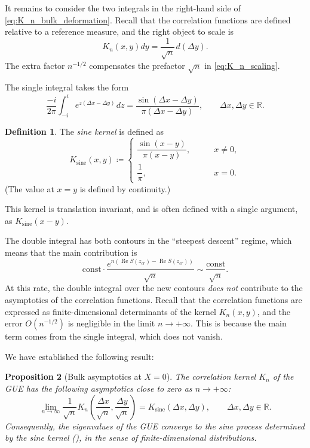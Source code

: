 \documentclass[letterpaper,11pt,oneside,reqno]{article}
\numberwithin{equation}{section}
\newcommand{\ssp}{\hspace{1pt}}
\newtheorem{proposition}{Proposition}[section]
\theoremstyle{definition}
\newtheorem{definition}[proposition]{Definition}
\begin{document}
It remains to consider the two integrals in the right-hand side
of \eqref{eq:K_n_bulk_deformation}.
Recall that the correlation functions are
defined relative to a reference measure, and the right object to scale is
\begin{equation*}
	K_n(x,y)dy=\frac{1}{\sqrt n}\ssp d\left( \Delta y \right).
\end{equation*}
The extra factor $n^{-1/2}$
compensates the prefactor $\sqrt n$ in
\eqref{eq:K_n_scaling}.

The single integral takes the form
\begin{equation}
	\label{eq:K_n_bulk_single}
	\frac{-i}{2\pi}
	\int_{-i}^i
	e^{z (\Delta x -\Delta y)}
	\ssp
	dz
	=\frac{\sin\left( \Delta x-\Delta y \right)}{\pi(\Delta x-\Delta y)},
	\qquad \Delta x,\Delta y\in\mathbb{R}.
\end{equation}
\begin{definition}
	\label{def:sine-kernel}
	The \emph{sine kernel} is defined as
	\begin{equation*}
		K_{\mathrm{sine}}(x,y)\coloneqq
		\begin{cases}
			\dfrac{\sin (x-y)}{\pi (x-y)},&\qquad x\ne 0,\\[10pt]
			\dfrac{1}{\pi},&\qquad x=0.
		\end{cases}
	\end{equation*}
	(The value at $x=y$ is defined by continuity.)

	This kernel is translation invariant, and is often
	defined with a single argument, as
	$K_{\mathrm{sine}}(x-y)$.
\end{definition}

The double integral has both contours
in the ``steepest descent'' regime, which means that
the main contribution is
\begin{equation*}
	\mathrm{const}\cdot
	\frac{e^{n\left( \operatorname{Re}S(z_{cr})-\operatorname{Re}S(z_{cr}) \right)}}{\sqrt n}
	\sim \frac{\mathrm{const}}{\sqrt n}.
\end{equation*}
At this rate, the double integral over the new contours
\emph{does not} contribute to the asymptotics of the correlation functions.
Recall that the correlation functions are expressed as finite-dimensional
determinants of the kernel $K_n(x,y)$, and the error $O(n^{-1/2})$ is
negligible in the limit $n\to+\infty$.
This is because the main term comes from the single integral,
which does not vanish.

We have established the following result:
\begin{proposition}[Bulk asymptotics at $X=0$]
	\label{prop:bulk}
	The correlation kernel $K_n$ of the GUE has the following asymptotics
	close to zero as $n\to+\infty$:
	\begin{equation*}
		\lim_{n\to \infty}
		\frac{1}{\sqrt n}
		K_n\left( \frac{\Delta x}{\sqrt n},\frac{\Delta y}{\sqrt n} \right)
		=
		K_{\mathrm{sine}}\left( \Delta x,\Delta y \right),
		\qquad \Delta x,\Delta y\in\mathbb{R}.
	\end{equation*}
	Consequently, the eigenvalues of the GUE converge to the sine process
	determined by the sine kernel (),
	in the sense of finite-dimensional distributions.
\end{proposition}
\end{document}
